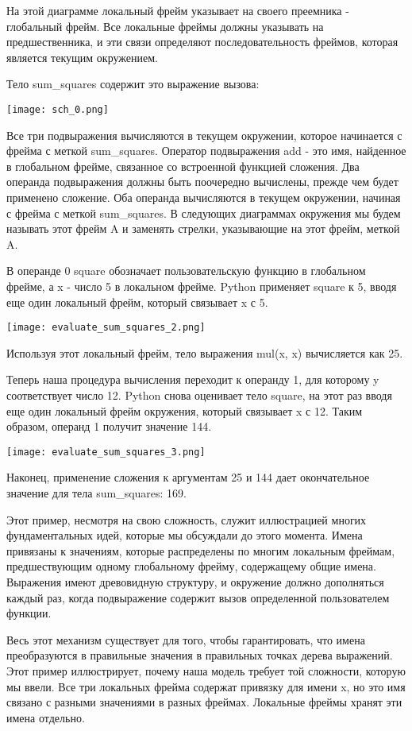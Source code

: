 На этой диаграмме локальный фрейм указывает на своего преемника - глобальный фрейм.
Все локальные фреймы должны указывать на предшественника, и эти связи определяют последовательность фреймов, которая является текущим окружением.

Тело sum\_squares содержит это выражение вызова:
\begin{center}
  \texttt{[image: sch\_0.png]}
\end{center}

Все три подвыражения вычисляются в текущем окружении, которое начинается с фрейма с меткой sum\_squares.
Оператор подвыражения add - это имя, найденное в глобальном фрейме, связанное со встроенной функцией сложения.
Два операнда подвыражения должны быть поочередно вычислены, прежде чем будет применено сложение.
Оба операнда вычисляются в текущем окружении, начиная с фрейма с меткой sum\_squares.
В следующих диаграммах окружения мы будем называть этот фрейм A и заменять стрелки, указывающие на этот фрейм, меткой A.

В операнде 0 square обозначает пользовательскую функцию в глобальном фрейме, а x - число 5 в локальном фрейме.
Python применяет square к 5, вводя еще один локальный фрейм, который связывает x с 5.
\begin{center}
  \texttt{[image: evaluate\_sum\_squares\_2.png]}
\end{center}

Используя этот локальный фрейм, тело выражения mul(x, x) вычисляется как 25.

Теперь наша процедура вычисления переходит к операнду 1, для которому y соответствует число 12.
Python снова оценивает тело square, на этот раз вводя еще один локальный фрейм окружения, который связывает x с 12. Таким образом, операнд 1 получит значение 144.
\begin{center}
  \texttt{[image: evaluate\_sum\_squares\_3.png]}
\end{center}

Наконец, применение сложения к аргументам 25 и 144 дает окончательное значение для тела sum\_squares: 169.

Этот пример, несмотря на свою сложность, служит иллюстрацией многих фундаментальных идей, которые мы обсуждали до этого момента.
Имена привязаны к значениям, которые распределены по многим локальным фреймам, предшествующим одному глобальному фрейму, содержащему общие имена.
Выражения имеют древовидную структуру, и окружение должно дополняться каждый раз, когда подвыражение содержит вызов определенной пользователем функции.

Весь этот механизм существует для того, чтобы гарантировать, что имена преобразуются в правильные значения в правильных точках дерева выражений.
Этот пример иллюстрирует, почему наша модель требует той сложности, которую мы ввели.
Все три локальных фрейма содержат привязку для имени x, но это имя связано с разными значениями в разных фреймах. Локальные фреймы хранят эти имена отдельно.
